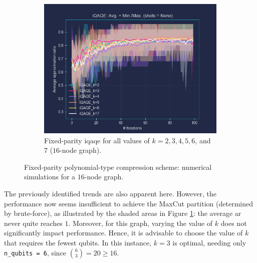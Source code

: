 \clearpage

\begin{figure}[ht!]
  \addtocounter{figure}{-1} %
  \centering
  \begin{subfigure}[b]{\textwidth}
      \addtocounter{subfigure}{2} %
      \centering
      \includegraphics[width=1\textwidth]{Figures/Chapter_5/Fixed-parity/All_k's(16-node).png}
      \caption{Fixed-parity \acrshort{iqaqe} for all values of $k = 2, 3, 4, 5, 6$, and $7$ ($16$-node graph).}
      \label{fig:All_k's(16_node)}
  \end{subfigure}
  \caption{Fixed-parity polynomial-type compression scheme: numerical simulations for a $16$-node graph.}
  \label{fig:Fixed-parity(16_node)}
\end{figure}

The previously identified trends are also apparent here. However, the performance now seems insufficient to achieve the MaxCut partition (determined by brute-force), as illustrated by the shaded areas in Figure \ref{fig:All_k's(16_node)}: the average \acrshort{ar} never quite reaches $1$. Moreover, for this graph, varying the value of $k$ does not significantly impact performance. Hence, it is advisable to choose the value of $k$ that requires the fewest qubits. In this instance, $k=3$ is optimal, needing only \texttt{n\_qubits = 6}, since $\binom{6}{3} = 20 \geq 16$.


